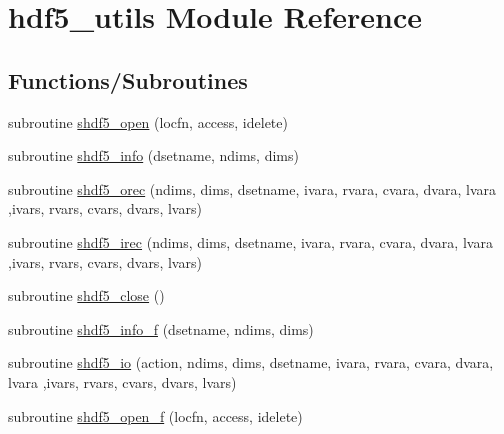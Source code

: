 \hypertarget{namespacehdf5__utils}{}\section{hdf5\+\_\+utils Module Reference}
\label{namespacehdf5__utils}
\subsection*{Functions/\+Subroutines}
\begin{DoxyCompactItemize}
\item 
subroutine \hyperlink{namespacehdf5__utils_a8324e53f06756f48c91f3735f9d26640}{shdf5\+\_\+open} (locfn, access, idelete)
\item 
subroutine \hyperlink{namespacehdf5__utils_a5dbfd8881a533f6a96e2fe24a26b41e7}{shdf5\+\_\+info} (dsetname, ndims, dims)
\item 
subroutine \hyperlink{namespacehdf5__utils_a5ac4831db37043197944d11e350994cf}{shdf5\+\_\+orec} (ndims, dims, dsetname, ivara, rvara, cvara, dvara, lvara                                                                                                                                                                   ,ivars, rvars, cvars, dvars, lvars)
\item 
subroutine \hyperlink{namespacehdf5__utils_a3d95236f5d68305d35c4c0cf93daac70}{shdf5\+\_\+irec} (ndims, dims, dsetname, ivara, rvara, cvara, dvara, lvara                                                                                                                                                                   ,ivars, rvars, cvars, dvars, lvars)
\item 
subroutine \hyperlink{namespacehdf5__utils_ac2a5ad4876fe382625c40cd9964ca3c1}{shdf5\+\_\+close} ()
\item 
subroutine \hyperlink{namespacehdf5__utils_a5149c551d73478f502b8660e3bdbd5b8}{shdf5\+\_\+info\+\_\+f} (dsetname, ndims, dims)
\item 
subroutine \hyperlink{namespacehdf5__utils_ab16be1368bf81b1ead660310e178c07e}{shdf5\+\_\+io} (action, ndims, dims, dsetname, ivara, rvara, cvara, dvara, lvara                                                                                                                                                                                       ,ivars, rvars, cvars, dvars, lvars)
\item 
subroutine \hyperlink{namespacehdf5__utils_ab621eee22271edfd3bf37b44d5b657e6}{shdf5\+\_\+open\+\_\+f} (locfn, access, idelete)

\end{DoxyCompactItemize}
